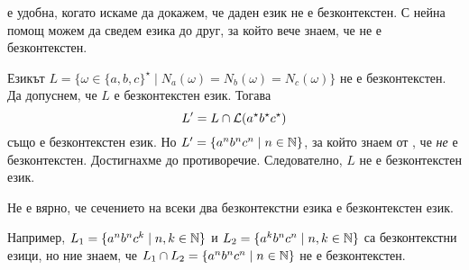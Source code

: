  е удобна, когато искаме да докажем, че даден език не е безконтекстен.
С нейна помощ можем да сведем езика до друг, за който вече знаем, че не е безконтекстен.

\begin{example}
  Езикът $L = \{\omega \in \{a,b,c\}^\star \mid N_a(\omega) = N_b(\omega) = N_c(\omega)\}$ не е безконтекстен.
  Да допуснем, че $L$ е безконтекстен език.
  Тогава \[L^\prime = L \cap \mathcal{L}(a^\star b^\star c^\star)\] също е безконтекстен език.
  Но $L^\prime = \{a^nb^nc^n \mid n \in \mathbb{N}\}$, за който знаем от , че {\em не} е безконтекстен.
  Достигнахме до противоречие. Следователно, $L$ не е безконтекстен език.
\end{example}

\begin{framed}
  \begin{remark}
    Не е вярно, че сечението на всеки два безконтекстни езика е безконтекстен език.

    Например, $L_1 = \{a^nb^nc^k \mid n,k\in\mathbb{N}\}$ и $L_2 = \{a^kb^nc^n \mid n,k\in\mathbb{N}\}$
    са безконтекстни езици, но ние знаем, че $L_1 \cap L_2 = \{a^nb^nc^n \mid n \in \mathbb{N}\}$ не е безконтекстен.
  \end{remark}
\end{framed}

